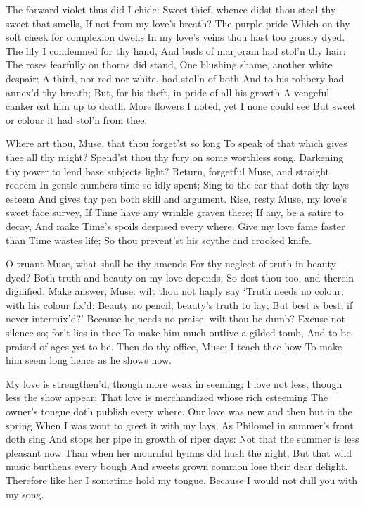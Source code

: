 \documentclass[twocolumn]{book}
\begin{document}
{
\Forma{}%
The forward violet thus did I chide:
Sweet thief, whence didst thou steal thy sweet that smells,
If not from my love's breath? The purple pride
Which on thy soft cheek for complexion dwells
In my love's veins thou hast too grossly dyed.
The lily I condemned for thy hand,
And buds of marjoram had stol'n thy hair:
The roses fearfully on thorns did stand,
One blushing shame, another white despair;
A third, nor red nor white, had stol'n of both
And to his robbery had annex'd thy breath;
But, for his theft, in pride of all his growth
A vengeful canker eat him up to death.
  More flowers I noted, yet I none could see
  But sweet or colour it had stol'n from thee.
}

Where art thou, Muse, that thou forget'st so long
To speak of that which gives thee all thy might?
Spend'st thou thy fury on some worthless song,
Darkening thy power to lend base subjects light?
\numerus*{}Return, forgetful Muse, and straight redeem
In gentle numbers time so idly spent;
Sing to the ear that doth thy lays esteem
And gives thy pen both skill and argument.
Rise, resty Muse, my love's sweet face survey,
If Time have any wrinkle graven there;
If any, be a satire to decay,
And make Time's spoils despised every where.
  Give my love fame faster than Time wastes life;
  So thou prevent'st his scythe and crooked knife.


O truant Muse, what shall be thy amends
For thy neglect of truth in beauty dyed?
Both truth and beauty on my love depends;
So dost thou too, and therein dignified.
Make answer, Muse: wilt thou not haply say
`Truth needs no colour, with his colour fix'd;
Beauty no pencil, beauty's truth to lay;
But best is best, if never intermix'd?'
Because he needs no praise, wilt thou be dumb?
Excuse not silence so; for't lies in thee
To make him much outlive a gilded tomb,
And to be praised of ages yet to be.
  Then do thy office, Muse; I teach thee how
  To make him seem long hence as he shows now.


My love is strengthen'd, though more weak in seeming;
I love not less, though less the show appear:
That love is merchandized whose rich esteeming
The owner's tongue doth publish every where.
Our love was new and then but in the spring
When I was wont to greet it with my lays,
As Philomel in summer's front doth sing
And stops her pipe in growth of riper days:
Not that the summer is less pleasant now
Than when her mournful hymns did hush the night,
But that wild music burthens every bough
And sweets grown common lose their dear delight.
  Therefore like her I sometime hold my tongue,
  Because I would not dull you with my song.
\end{document}
